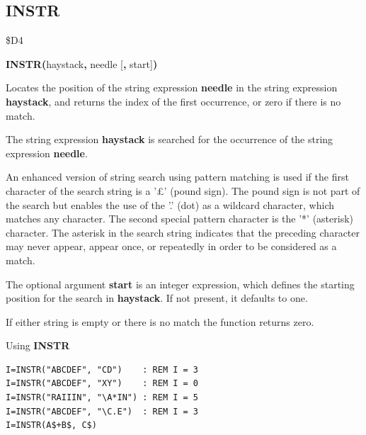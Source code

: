 \subsection{INSTR}
\begin{description}[leftmargin=2cm,style=nextline]
\item [Token:]    \$D4

\item [Format:]   {\bf INSTR(}haystack{\bf,} needle [{\bf,} start]{\bf)}

\item [Usage:]    Locates the position of the string expression {\bf needle} in the string expression {\bf haystack}, and returns the index of the first occurrence, or zero if there is no match.

                  The string expression {\bf haystack} is searched for the occurrence of the string expression {\bf needle}.

                  An enhanced version of string search using pattern matching is used if the first character of the search string is a '£' (pound sign). The pound sign is not part of the search but enables the use of the '.' (dot) as a wildcard character, which matches any character. The second special pattern character is the '*' (asterisk) character. The asterisk in the search string indicates that the preceding character may never appear, appear once, or repeatedly in order to be considered as a match.

                  The optional argument {\bf start} is an integer expression, which defines the starting position for the search in {\bf haystack}. If not present, it defaults to one.

\item [Remarks:]  If either string is empty or there is no match the function returns zero.

\item [Examples:] Using {\bf INSTR}

\begin{tcolorbox}[colback=black,coltext=white]
\verbatimfont{\codefont}
\begin{verbatim}
I=INSTR("ABCDEF", "CD")    : REM I = 3
I=INSTR("ABCDEF", "XY")    : REM I = 0
I=INSTR("RAIIIN", "\A*IN") : REM I = 5
I=INSTR("ABCDEF", "\C.E")  : REM I = 3
I=INSTR(A$+B$, C$)
\end{verbatim}
\end{tcolorbox}
\end{description}

